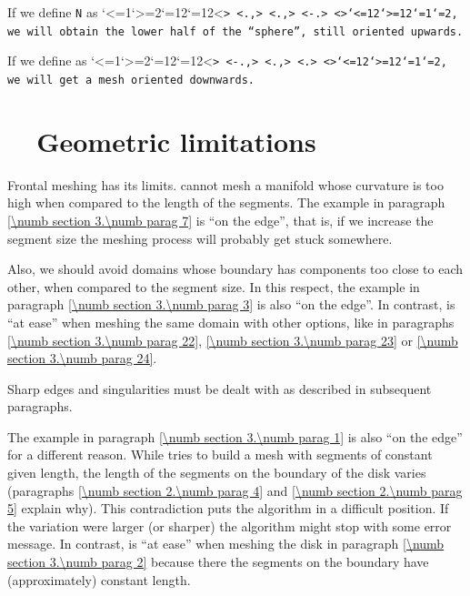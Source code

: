 If we define {\small\tt\azul N} as \catcode`<=1\catcode`>=2\catcode`{=12\catcode`}=12<\small\tt {>
<\small\tt{}\laranja.,> <\small\tt{}\laranja.,>
<\small\tt \laranja-\laranja.> <\small\tt }>\catcode`<=12\catcode`>=12\catcode`{=1\catcode`}=2, we will obtain
the lower half of the ``sphere'', still oriented upwards.

If we define {\small\tt{}} as \catcode`<=1\catcode`>=2\catcode`{=12\catcode`}=12<\small\tt {>
<\small\tt\laranja-\laranja.,> <\small\tt{}\laranja.,> <\small\tt{}\laranja.> <\small\tt }>\catcode`<=12\catcode`>=12\catcode`{=1\catcode`}=2, we will get a mesh
oriented downwards.


\section{~~Geometric limitations}\label{\numb section 3.\numb parag 16}

Frontal meshing has its limits.
{\ManiFEM} cannot mesh a manifold whose curvature is too high when compared to the
length of the segments.
The example in paragraph \ref{\numb section 3.\numb parag 7} is ``on the edge'', that is,
if we increase the segment size the meshing process will probably get stuck somewhere.

Also, we should avoid domains whose boundary has components too close to each other,
when compared to the segment size.
In this respect, the example in paragraph \ref{\numb section 3.\numb parag 3} is also
``on the edge''.
In contrast, {\maniFEM} is ``at ease'' when meshing the same domain with other options,
like in paragraphs \ref{\numb section 3.\numb parag 22}, \ref{\numb section 3.\numb parag 23}
or \ref{\numb section 3.\numb parag 24}.

Sharp edges and singularities must be dealt with as described in subsequent paragraphs.

The example in paragraph \ref{\numb section 3.\numb parag 1} is also ``on the edge''
for a different reason.
While {\maniFEM} tries to build a mesh with segments of constant given length,
the length of the segments on the boundary of the disk varies (paragraphs
\ref{\numb section 2.\numb parag 4} and \ref{\numb section 2.\numb parag 5} explain why).
This contradiction puts the algorithm in a difficult position.
If the variation were larger (or sharper) the algorithm might stop with some error message.
In contrast, {\maniFEM} is ``at ease'' when meshing the disk in paragraph
\ref{\numb section 3.\numb parag 2} because there the segments on the boundary have
(approximately) constant length.



